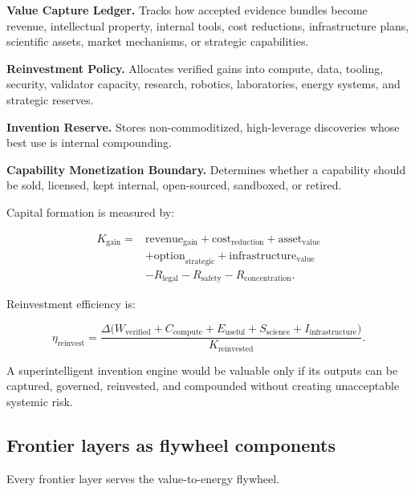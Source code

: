 \documentclass[
  11pt,
]{article}
\begin{document}
\textbf{Value Capture Ledger.} Tracks how accepted evidence bundles
become revenue, intellectual property, internal tools, cost reductions,
infrastructure plans, scientific assets, market mechanisms, or strategic
capabilities.

\textbf{Reinvestment Policy.} Allocates verified gains into compute,
data, tooling, security, validator capacity, research, robotics,
laboratories, energy systems, and strategic reserves.

\textbf{Invention Reserve.} Stores non-commoditized, high-leverage
discoveries whose best use is internal compounding.

\textbf{Capability Monetization Boundary.} Determines whether a
capability should be sold, licensed, kept internal, open-sourced,
sandboxed, or retired.

Capital formation is measured by:

\[
\begin{aligned}
K_{\mathrm{gain}}={}&
\mathrm{revenue}_{\mathrm{gain}}
+\mathrm{cost}_{\mathrm{reduction}}
+\mathrm{asset}_{\mathrm{value}} \\
&+\mathrm{option}_{\mathrm{strategic}}
+\mathrm{infrastructure}_{\mathrm{value}} \\
&-R_{\mathrm{legal}}-R_{\mathrm{safety}}-R_{\mathrm{concentration}}.
\end{aligned}
\]

Reinvestment efficiency is:

\[
\eta_{\mathrm{reinvest}}
=
\frac{
\Delta\!\big(W_{\mathrm{verified}}+C_{\mathrm{compute}}+E_{\mathrm{useful}}
+S_{\mathrm{science}}+I_{\mathrm{infrastructure}}\big)
}{K_{\mathrm{reinvested}}}.
\]

A superintelligent invention engine would be valuable only if its
outputs can be captured, governed, reinvested, and compounded without
creating unacceptable systemic risk.

\subsection{Frontier layers as flywheel
components}\label{frontier-layers-as-flywheel-components}

Every frontier layer serves the value-to-energy flywheel.
\end{document}
